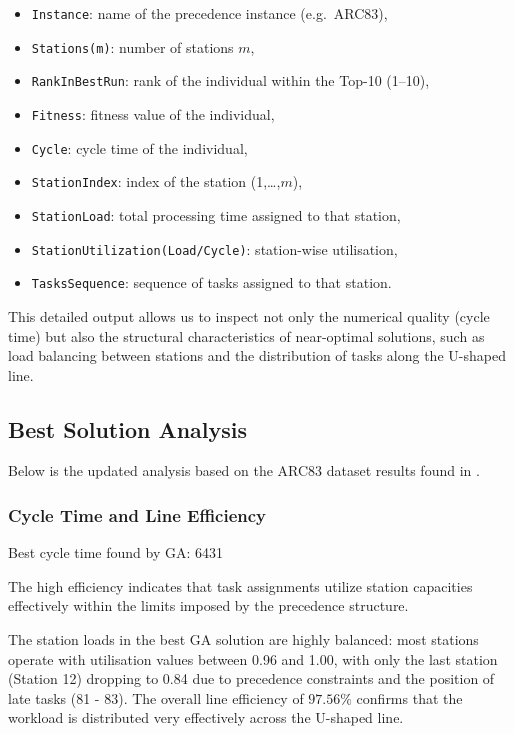 \documentclass[12pt,a4paper]{article}
\begin{document}
\begin{itemize}
    \item \texttt{Instance}: name of the precedence instance (e.g.\ ARC83),
    \item \texttt{Stations(m)}: number of stations $m$,
    \item \texttt{RankInBestRun}: rank of the individual within the Top-10 (1--10),
    \item \texttt{Fitness}: fitness value of the individual,
    \item \texttt{Cycle}: cycle time of the individual,
    \item \texttt{StationIndex}: index of the station (1,\dots,$m$),
    \item \texttt{StationLoad}: total processing time assigned to that station,
    \item \texttt{StationUtilization(Load/Cycle)}: station-wise utilisation,
    \item \texttt{TasksSequence}: sequence of tasks assigned to that station.
\end{itemize}

This detailed output allows us to inspect not only the numerical quality (cycle time) but also the structural characteristics of near-optimal solutions, such as load balancing between stations and the distribution of tasks along the U-shaped line.


\par
\subsection{Best Solution Analysis}
Below is the updated analysis based on the ARC83 dataset results found in .

\subsubsection{Cycle Time and Line Efficiency}

Best cycle time found by GA: 6431

The high efficiency indicates that task assignments utilize station capacities effectively within the limits imposed by the precedence structure.


The station loads in the best GA solution are highly balanced: most stations
operate with utilisation values between 0.96 and 1.00, with only the last
station (Station 12) dropping to 0.84 due to precedence constraints and the
position of late tasks (81 - 83). The overall line efficiency of $97.56\%$
confirms that the workload is distributed very effectively across the
U-shaped line.
\end{document}
